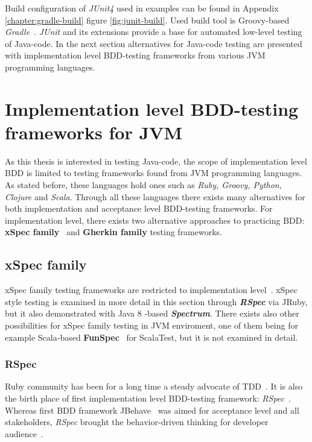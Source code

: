     Build configuration of \textit{JUnit4} used in examples can be found in Appendix \ref{chapter:gradle-build} figure \ref{fig:junit-build}.
    Used build tool is Groovy-based \textit{Gradle}~\cite{gradle}.
    \textit{JUnit} and its extensions provide a base for automated low-level testing of Java-code.
    In the next section alternatives for Java-code testing are presented with implementation level BDD-testing frameworks from
    various JVM programming languages.

\section{Implementation level BDD-testing frameworks for JVM}
    As this thesis is interested in testing Java-code, the scope of implementation level BDD is limited to testing frameworks
    found from JVM programming languages. As stated before, these languages hold ones such as \textit{Ruby, Groovy, Python,
    Clojure} and \textit{Scala}. Through all these languages there exists many alternatives for both implementation and
    acceptance level BDD-testing frameworks. For implementation level, there exists two alternative approaches to practicing
    BDD: \textbf{xSpec family}~\cite{solis2011study} and \textbf{Gherkin family} testing frameworks.

    \subsection{xSpec family}
    xSpec family testing frameworks are restricted to implementation level~\cite{solis2011study}. xSpec style testing
    is examined in more detail in this section through \textbf{\textit{RSpec}} via JRuby, but it also demonstrated with
    Java 8 -based \textbf{\textit{Spectrum}}. There exists also other possibilities for xSpec family testing in JVM enviroment,
    one of them being for example Scala-based \textbf{FunSpec}~\cite{funspec} for ScalaTest, but it is not examined in detail.

    \subsubsection{RSpec}
    Ruby community has been for a long time a steady advocate of TDD~\cite{lerner2009forge}. It is also the birth place
    of first implementation level BDD-testing framework: \textit{RSpec}~\cite{astels2006new}. Whereas first BDD framework
    JBehave~\cite{bdd2006north} was aimed for acceptance level and all stakeholders, \textit{RSpec} brought the behavior-driven thinking for developer
    audience~\cite{astels2006new}.

